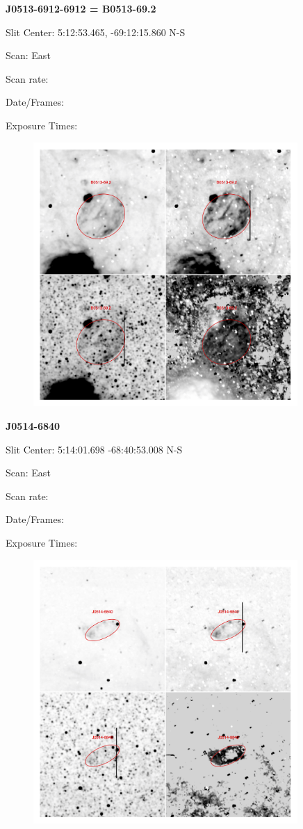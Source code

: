 \documentclass[11pt]{article}
\begin{document}
\newpage
{\bf J0513-6912-6912 = B0513-69.2}  
 
Slit Center:   5:12:53.465, -69:12:15.860    N-S 

Scan:  East

Scan rate:  

Date/Frames:

Exposure Times:  

\begin{figure}
\includegraphics[width=10.05cm]{snapshots/B0513-692.png}
\end{figure}

\newpage
{\bf J0514-6840}  
 
Slit Center:   5:14:01.698 -68:40:53.008    N-S 

Scan:  East

Scan rate:  

Date/Frames:

Exposure Times:  

\begin{figure}
\includegraphics[width=10.05cm]{snapshots/J0514-6840.png}
\end{figure}
\end{document}
